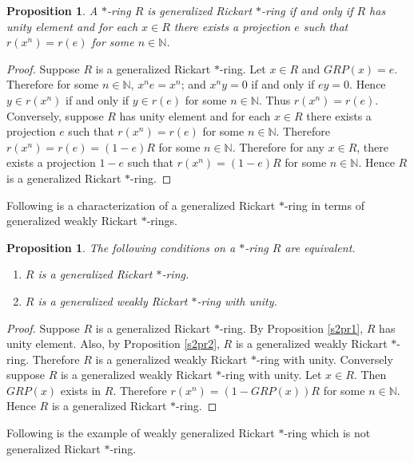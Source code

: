 \documentclass[11pt, one side,emlines]{amsart}
\newtheorem{proposition}[lemma]{Proposition}
\theoremstyle{definition}
\numberwithin{equation}{section} \thispagestyle{empty} \voffset
\begin{document}
\begin{proposition} \label{s2pr7} A $*$-ring $R$ is generalized Rickart $*$-ring if and only if $R$ has unity element and
		for each $x\in R$ there exists a projection $e$ such that $r(x^n)=r(e)$ for some $n\in \mathbb N$.	
\end{proposition}
\begin{proof} Suppose $R$ is a generalized  Rickart $*$-ring.
Let $x\in R$ and $GRP(x)=e$. Therefore for some $ n\in\mathbb N $, $x^ne=x^n$; and $x^ny=0$ if and only if  $ey=0$. Hence $y\in  r(x^n)$ if and only if $y\in r(e)$ for some $n\in \mathbb N$. Thus $r(x^n)=r(e)$. 
	Conversely, suppose $R$ has unity element and
	for each $x\in R$ there exists a projection $e$ such that $r(x^n)=r(e)$ for some $n\in \mathbb N$.
	Therefore $r(x^n)=r(e)=(1-e)R$ for some $n\in \mathbb N$.
	Therefore for any $x\in R$, there exists a projection $1-e$ such that  
	$r(x^n)=(1-e)R$ for some $n\in \mathbb N$. Hence $R$ is a generalized  Rickart $*$-ring. 
\end{proof}

 Following is a characterization of a generalized Rickart $*$-ring in terms of generalized weakly Rickart $*$-rings.

\begin{proposition} \label{s2pr8} The following conditions on a $*$-ring $R$ are equivalent.
	\begin{enumerate}
		\item $R$ is a generalized  Rickart $*$-ring.  
		\item $R$ is a generalized weakly Rickart $*$-ring with unity.
	\end{enumerate}
\end{proposition}
\begin{proof} Suppose $R$ is a generalized Rickart $*$-ring.
	By Proposition \ref{s2pr1}, $R$ has unity element. Also, by Proposition \ref{s2pr2}, $R$ is a generalized weakly Rickart $*$-ring. Therefore $R$ is a generalized weakly Rickart $*$-ring with unity.
	Conversely suppose $R$ is a generalized weakly Rickart $*$-ring with unity.
	Let $x\in R$. Then $GRP(x)$ exists in $R$. Therefore $r(x^n)=(1-GRP(x)) R$ for some $n \in \mathbb N$.
	Hence $R$ is a generalized  Rickart $*$-ring.
\end{proof}

Following is the example of weakly generalized Rickart $*$-ring which is not generalized Rickart $*$-ring.
\end{document}
